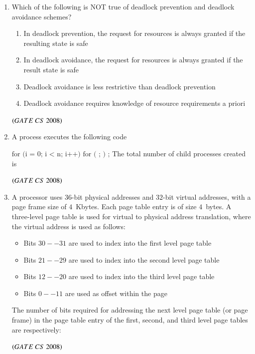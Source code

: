 \documentclass[journal]{IEEEtran}
\numberwithin{equation}{enumi}
\numberwithin{figure}{enumi}
\begin{document}
\begin{enumerate}
\item Which of the following is NOT true of deadlock prevention and deadlock
avoidance schemes? 
\begin{enumerate}
   \item  In deadlock prevention, the request for resources is always granted if the resulting state is safe
   \item In deadlock avoidance, the request for resources is always granted if the result state is safe
   \item Deadlock avoidance is less restrictive than deadlock prevention
   \item  Deadlock avoidance requires knowledge of resource requirements a priori   
 \end{enumerate}
\hfill $\left(GATE\ CS\  2008\right)$

\item A process executes the following code

$
\text{for (i = 0; i < n; i++) for ( ; ) ;}
$
The total number of child processes created is
\begin{enumerate} 
\end{enumerate}
\hfill $\left(GATE\ CS\  2008\right)$

\item A processor uses $36$-bit physical addresses and $32$-bit virtual addresses, with a page frame size of $4$~Kbytes.  
Each page table entry is of size $4$~bytes.  
A three-level page table is used for virtual to physical address translation, where the virtual address is used as follows:

\begin{itemize}
    \item Bits $30--31$ are used to index into the first level page table
    \item Bits $21--29$ are used to index into the second level page table
    \item Bits $12--20$ are used to index into the third level page table
    \item Bits $0--11$ are used as offset within the page
\end{itemize}

The number of bits required for addressing the next level page table (or page frame) in the page table entry of the first, second, and third level page tables are respectively:
\begin{enumerate} 
\end{enumerate}
\hfill $\left(GATE\ CS\  2008\right)$


\end{enumerate}
\end{document}
